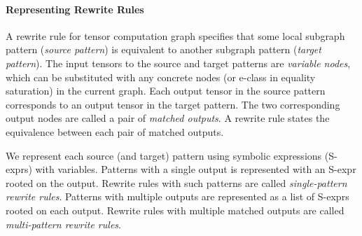 \paragraph{Representing Rewrite Rules}
\label{sec:rewrite}

A rewrite rule for tensor computation graph specifies that some local subgraph pattern (\textit{source pattern}) is equivalent to another subgraph pattern (\textit{target pattern}).
The input tensors to the source and target patterns are \textit{variable nodes}, which can be substituted with any concrete nodes (or e-class in equality saturation) in the current graph.
Each output tensor in the source pattern corresponds to an output tensor in the target pattern.
The two corresponding output nodes are called a pair of \textit{matched outputs}.
A rewrite rule states the equivalence between each pair of matched outputs.

We represent each source (and target) pattern using symbolic expressions (S-exprs) with variables.
Patterns with a single output is represented with an S-expr rooted on the output.
Rewrite rules with such patterns are called \textit{single-pattern rewrite rules}.
Patterns with multiple outputs are represented as a list of S-exprs rooted on each output.
Rewrite rules with multiple matched outputs are called \textit{multi-pattern rewrite rules}.


